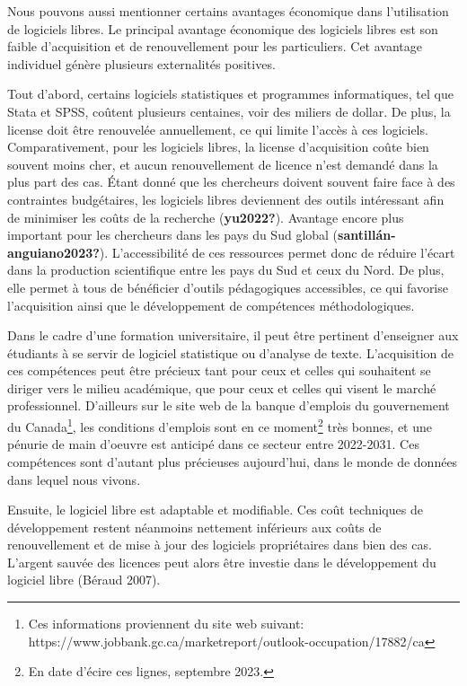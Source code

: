 \documentclass[
  letterpaper,
]{scrbook}
\begin{document}
Nous pouvons aussi mentionner certains avantages économique dans
l'utilisation de logiciels libres. Le principal avantage économique des
logiciels libres est son faible d'acquisition et de renouvellement pour
les particuliers. Cet avantage individuel génère plusieurs externalités
positives.

Tout d'abord, certains logiciels statistiques et programmes
informatiques, tel que Stata et SPSS, coûtent plusieurs centaines, voir
des miliers de dollar. De plus, la license doit être renouvelée
annuellement, ce qui limite l'accès à ces logiciels. Comparativement,
pour les logiciels libres, la license d'acquisition coûte bien souvent
moins cher, et aucun renouvellement de licence n'est demandé dans la
plus part des cas. Étant donné que les chercheurs doivent souvent faire
face à des contraintes budgétaires, les logiciels libres deviennent des
outils intéressant afin de minimiser les coûts de la recherche
(\textbf{yu2022?}). Avantage encore plus important pour les chercheurs
dans les pays du Sud global (\textbf{santillán-anguiano2023?}).
L'accessibilité de ces ressources permet donc de réduire l'écart dans la
production scientifique entre les pays du Sud et ceux du Nord. De plus,
elle permet à tous de bénéficier d'outils pédagogiques accessibles, ce
qui favorise l'acquisition ainsi que le développement de compétences
méthodologiques.

Dans le cadre d'une formation universitaire, il peut être pertinent
d'enseigner aux étudiants à se servir de logiciel statistique ou
d'analyse de texte. L'acquisition de ces compétences peut être précieux
tant pour ceux et celles qui souhaitent se diriger vers le milieu
académique, que pour ceux et celles qui visent le marché professionnel.
D'ailleurs sur le site web de la banque d'emplois du gouvernement du
Canada\footnote{Ces informations proviennent du site web suivant:
  https://www.jobbank.gc.ca/marketreport/outlook-occupation/17882/ca},
les conditions d'emplois sont en ce moment\footnote{En date d'écire ces
  lignes, septembre 2023.} très bonnes, et une pénurie de main d'oeuvre
est anticipé dans ce secteur entre 2022-2031. Ces compétences sont
d'autant plus précieuses aujourd'hui, dans le monde de données dans
lequel nous vivons.

Ensuite, le logiciel libre est adaptable et modifiable. Ces coût
techniques de développement restent néanmoins nettement inférieurs aux
coûts de renouvellement et de mise à jour des logiciels propriétaires
dans bien des cas. L'argent sauvée des licences peut alors être investie
dans le développement du logiciel libre (Béraud 2007).
\end{document}
